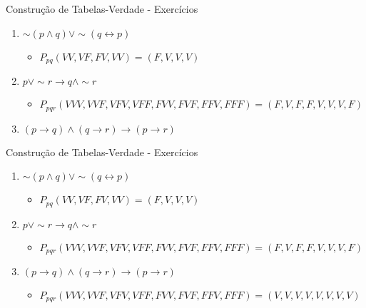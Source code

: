 \begin{frame}[t]{Construção de Tabelas-Verdade - Exercícios} %
	\begin{enumerate}
	\item $\sim (p \wedge q) \vee\sim (q \leftrightarrow p)$
	   \begin{itemize} \item $P_{pq}(VV, VF, FV, VV) = (F, V, V, V)$ \end{itemize}
	\item $p \vee\sim r \rightarrow q \wedge\sim r$
	   \begin{itemize} \item $P_{pqr}(VVV, VVF, VFV, VFF, FVV, FVF, FFV, FFF) = (F, V, F, F, V, V, V, F)$ \end{itemize}
	\item $(p \rightarrow q) \wedge (q \rightarrow r) \rightarrow (p \rightarrow r)$
	\end{enumerate}
\end{frame}

\begin{frame}[t]{Construção de Tabelas-Verdade - Exercícios} %
	\begin{enumerate}
	\item $\sim (p \wedge q) \vee\sim (q \leftrightarrow p)$
	   \begin{itemize} \item $P_{pq}(VV, VF, FV, VV) = (F, V, V, V)$ \end{itemize}
	\item $p \vee\sim r \rightarrow q \wedge\sim r$
	   \begin{itemize} \item $P_{pqr}(VVV, VVF, VFV, VFF, FVV, FVF, FFV, FFF) = (F, V, F, F, V, V, V, F)$ \end{itemize}
	\item $(p \rightarrow q) \wedge (q \rightarrow r) \rightarrow (p \rightarrow r)$
	   \begin{itemize} \item $P_{pqr}(VVV, VVF, VFV, VFF, FVV, FVF, FFV, FFF) = (V, V, V, V, V, V, V, V)$ \end{itemize}
	\end{enumerate}
\end{frame}



